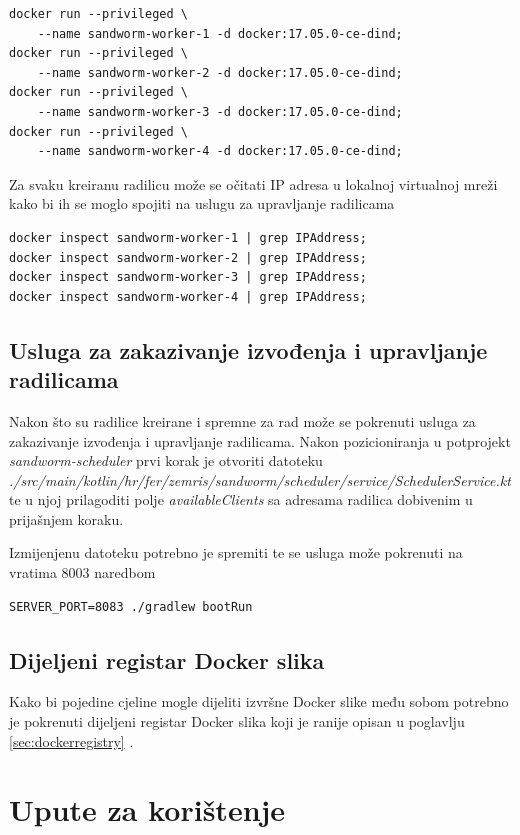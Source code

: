 \documentclass[times, utf8, zavrsni]{fer}
\begin{document}
{{{\begin{appendices}
\begin{lstlisting}
docker run --privileged \
	--name sandworm-worker-1 -d docker:17.05.0-ce-dind;
docker run --privileged \
	--name sandworm-worker-2 -d docker:17.05.0-ce-dind;
docker run --privileged \
	--name sandworm-worker-3 -d docker:17.05.0-ce-dind;
docker run --privileged \
	--name sandworm-worker-4 -d docker:17.05.0-ce-dind;
\end{lstlisting}

Za svaku kreiranu radilicu može se očitati IP adresa u lokalnoj virtualnoj mreži kako bi ih se moglo spojiti na uslugu za upravljanje radilicama

\begin{lstlisting}
docker inspect sandworm-worker-1 | grep IPAddress;
docker inspect sandworm-worker-2 | grep IPAddress;
docker inspect sandworm-worker-3 | grep IPAddress;
docker inspect sandworm-worker-4 | grep IPAddress;
\end{lstlisting}

\section{Usluga za zakazivanje izvođenja i upravljanje radilicama}

Nakon što su radilice kreirane i spremne za rad može se pokrenuti usluga za zakazivanje izvođenja i upravljanje radilicama. Nakon pozicioniranja u potprojekt {\textit{sandworm-scheduler}} prvi korak je otvoriti datoteku {\textit{./src/main/kotlin/hr/fer/zemris/sandworm/scheduler/service/SchedulerService.kt}} te u njoj prilagoditi polje {\textit{availableClients}} sa adresama radilica dobivenim u prijašnjem koraku.

Izmijenjenu datoteku potrebno je spremiti te se usluga može pokrenuti na vratima 8003 naredbom

\begin{lstlisting}
SERVER_PORT=8083 ./gradlew bootRun
\end{lstlisting}

\section{Dijeljeni registar Docker slika}

Kako bi pojedine cjeline mogle dijeliti izvršne Docker slike među sobom potrebno je pokrenuti dijeljeni registar Docker slika koji je ranije opisan u poglavlju \ref{sec:dockerregistry} .

\chapter{Upute za korištenje}
\label{sec:usagemanual}


\end{appendices}}}}
\end{document}
